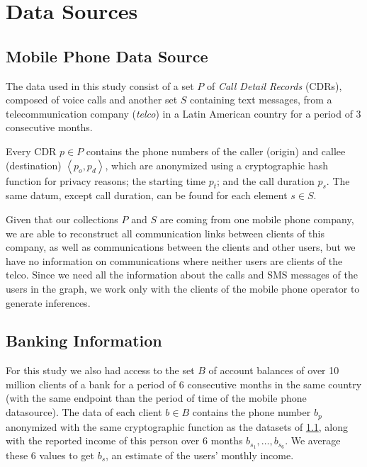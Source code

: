 
\section{Data Sources}
\label{sec:data_sources}

\subsection{Mobile Phone Data Source}
\label{subsec:telcoinformation}

The data used in this study consist of a set $P$ of \textit{Call Detail Records} (CDRs), composed of voice calls and another set $S$ containing text messages, from a telecommunication company (\textit{telco}) in a Latin American country for a period of 3 consecutive months.

Every CDR $p \in P$ contains the phone numbers of the caller (origin) and callee (destination) $\left< p_o, p_d \right>$, which are anonymized using a cryptographic hash function for privacy reasons; the starting time \( p_t \); and the call duration \( p_s \). The same datum, except call duration, can be found for each element $s \in S$.

Given that our collections $P$ and $S$ are coming from one mobile phone company, we are able to reconstruct all communication links between clients of this company, as well as communications between the clients and other users, but we have no information on communications where neither users are clients of the telco. Since we need all the information about the calls and SMS messages of the users in the graph, we work only with the clients of the mobile phone operator to generate inferences.

\subsection{Banking Information}

For this study we also had access to the set $B$ of account balances of over 10 million clients of a bank for a period of 6 consecutive months in the same country (with the same endpoint than the period of time %
of the mobile phone datasource).
The data of each client $b \in B$ contains the phone number $b_p$ anonymized with the same cryptographic function as the datasets of \cref{subsec:telcoinformation}, along with the reported income of this person over 6 months $b_{s_1}, \ldots, b_{s_6}$. We average these 6 values to get $b_s$, an estimate of the users' monthly income.

